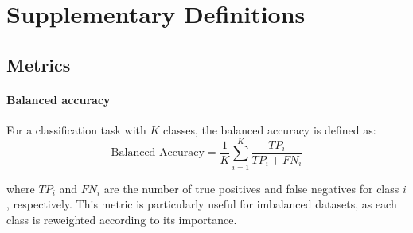 \section{Supplementary Definitions}
\label{sec:suppl-definitions}



\subsection{Metrics}

\paragraph{Balanced accuracy} For a classification task with $K$ classes, the balanced accuracy is defined as:
\begin{equation}\label{eq:balanced-accuracy}
\text{Balanced Accuracy} = \frac{1}{K} \sum_{i=1}^{K} \frac{TP_i}{TP_i + FN_i}
\end{equation}

where $TP_i$ and $FN_i$ are the number of true positives and false negatives for class $i$, respectively. This metric is particularly useful for imbalanced datasets, as each class is reweighted according to its importance.
